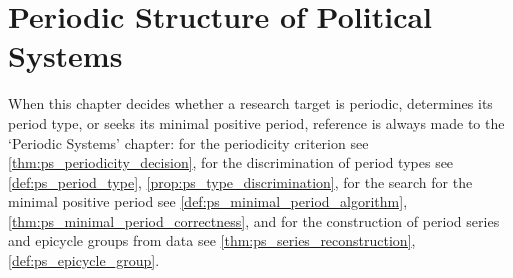 \chapter{Periodic Structure of Political Systems}

\begin{remark}\label{rem:politics_ps_hook}
When this chapter decides whether a research target is periodic, determines its period type, or seeks its minimal positive period, reference is always made to the `Periodic Systems' chapter:
for the periodicity criterion see \cref{thm:ps_periodicity_decision},
for the discrimination of period types see \cref{def:ps_period_type}, \cref{prop:ps_type_discrimination},
for the search for the minimal positive period see \cref{def:ps_minimal_period_algorithm}, \cref{thm:ps_minimal_period_correctness},
and for the construction of period series and epicycle groups from data see \cref{thm:ps_series_reconstruction}, \cref{def:ps_epicycle_group}.
\end{remark}

